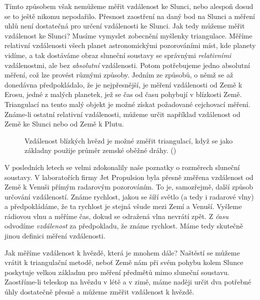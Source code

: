     Tímto způsobem však nemůžeme měřit vzdálenost ke Slunci, nebo alespoň dosud se to ještě nikomu 
    nepodařilo. Přesnost zaostření na daný bod na Slunci a měření uhlů není dostatečná pro určení 
    vzdálenosti ke Slunci. Jak tedy můžeme měřit vzdálenost ke Slunci? Musíme vymyslet zobecnění 
    myšlenky triangulace. Měříme relativní vzdálenosti všech planet astronomickými pozorováními 
    míst, kde planety vidíme, a tak dostáváme obraz sluneční soustavy se správnými 
    \emph{relativními} vzdálenostmi, ale bez \emph{absolutní} vzdálenosti. Potom potřebujeme jedno 
    absolutní měření, což lze provést různými způsoby. Jedním ze způsobů, o němž se až donedávna 
    předpokládalo, že je nejpřesnější, je měření vzdálenosti od Země k Erosu, jedné z malých 
    planetek, jež se čas od času pohybují v blízkosti Země. Triangulací na tento malý objekt je 
    možné získat požadované cejchovací měření. Známe-li ostatní relativní vzdálenosti, můžeme určit 
    například vzdálenost od Země ke Slunci nebo od Země k Plutu.
    
    \begin{figure}[ht!]  %
      \centering
      \caption{Vzdálenost blízkých hvězd je možné změřit triangulací, když se jako základny použije 
               průměr zemské oběžné dráhy. (\cite[s.~71]{Feynman01})}
      \label{fyz:fig069}
    \end{figure}     
    V posledních letech se velmi zdokonalily naše poznatky o rozměrech sluneční soustavy. V 
    laboratořích firmy Jet Propulsion byla přesně změřena vzdálenost od Země k Venuši přímým 
    radarovým pozorováním. To je, samozřejmě, další způsob určování vzdáleností. Známe rychlost, 
    jakou se šíří světlo (a tedy i radarové vlny) a předpokládáme, že ta rychlost je stejná všude 
    mezi Zemí a Venuší. Vyšleme rádiovou vlnu a měříme čas, dokud se odražená vlna nevrátí zpět. Z 
    \emph{času} odvodíme \emph{vzdálenost} za předpokladu, že známe rychlost. Máme tedy skutečně 
    jinou definici měření vzdálenosti.
    
    Jak měříme vzdálenost k hvězdě, která je mnohem dále? Naštěstí se můžeme vrátit k triangulační 
    metodě, neboť Země nám při svém pohybu kolem Slunce poskytuje velkou základnu pro měření 
    předmětů mimo sluneční soustavu. Zaostříme-li teleskop na hvězdu v létě a v zimě, máme naději 
    určit dva potřebné úhly dostatečně přesně a můžeme změřit vzdálenost k hvězdě.
   
